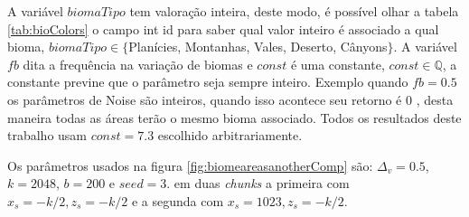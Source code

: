 A variável $biomaTipo$ tem valoração inteira, deste modo, é possível olhar a tabela \ref{tab:bioColors}
o campo int id para saber qual valor inteiro é associado a qual bioma, $biomaTipo \in \{$Planícies, Montanhas, Vales, Deserto, Cânyons$\}$.
A variável $fb$ dita a frequência na variação de biomas e $const$ é uma constante,
$const \in \mathbb{Q}$, a constante previne que o parâmetro seja sempre inteiro. Exemplo quando $fb = 0.5$
os parâmetros de Noise são inteiros, quando isso acontece seu retorno é $0$ \cite{perlin1985image}, desta maneira todas as áreas terão o mesmo bioma associado. Todos os resultados 
deste trabalho usam $const = 7.3$ escolhido arbitrariamente.

Os parâmetros usados na figura \ref{fig:biomeareasanotherComp} são: $\Delta_{v} = 0.5$, 
$k = 2048$, $b = 200$ e $seed = 3$. em duas \textit{chunks} a primeira com $ x_{s} = -k/2 , z_{s} = -k/2$
e a segunda com $ x_{s} = 1023 , z_{s} = -k/2$.

